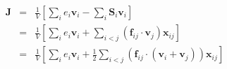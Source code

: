 \documentclass[12pt]{article}
\begin{document}
\begin{eqnarray*}
\mathbf{J} & = & \frac{1}{V} \left[ \sum_i e_i \mathbf{v}_i - \sum_{i} \mathbf{S}_{i} \mathbf{v}_i \right] \\
& = & \frac{1}{V} \left[ \sum_i e_i \mathbf{v}_i + \sum_{i<j} \left( \mathbf{f}_{ij} \cdot \mathbf{v}_j \right) \mathbf{x}_{ij} \right] \\
& = & \frac{1}{V} \left[ \sum_i e_i \mathbf{v}_i + \frac{1}{2} \sum_{i<j} \left( \mathbf{f}_{ij} \cdot \left(\mathbf{v}_i + \mathbf{v}_j \right)  \right) \mathbf{x}_{ij} \right]
\end{eqnarray*}
\end{document}
